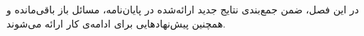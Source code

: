 

در این فصل، ضمن جمع‌بندی نتایج جدید ارائه‌شده در پایان‌نامه، 
مسائل باز باقی‌مانده و همچنین پیش‌نهادهایی برای ادامه‌ی کار ارائه می‌شوند.
